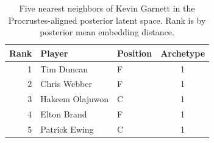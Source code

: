 \begin{table}[htbp]
  \centering\small
  \begin{tabular}{rllc}
    \toprule
    Rank & Player & Position & Archetype \\
    \midrule
    1 & Tim Duncan & F & 1 \\
    2 & Chris Webber & F & 1 \\
    3 & Hakeem Olajuwon & C & 1 \\
    4 & Elton Brand & F & 1 \\
    5 & Patrick Ewing & C & 1 \\
    \bottomrule
  \end{tabular}
  \caption{Five nearest neighbors of Kevin Garnett in the Procrustes-aligned posterior latent space. Rank is by posterior mean embedding distance.}
  \label{tab:Kevin_Garnett_neighbors}
\end{table}

